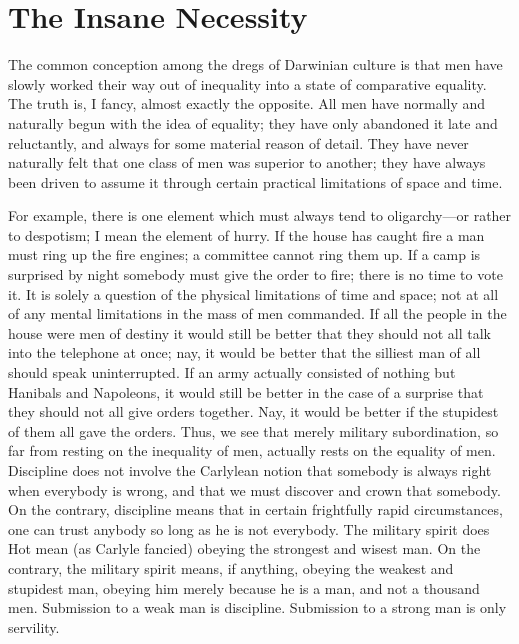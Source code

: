 \documentclass{book}
\begin{document}
\chapter{The Insane Necessity}
\label{chapter-17}
The common conception among the dregs of Darwinian culture is that men have slowly worked their way out of inequality into a state of comparative equality. The truth is, I fancy, almost exactly the opposite. All men have normally and naturally begun with the idea of equality; they have only abandoned it late and reluctantly, and always for some material reason of detail. They have never naturally felt that one class of men was superior to another; they have always been driven to assume it through certain practical limitations of space and time.

For example, there is one element which must always tend to oligarchy—or rather to despotism; I mean the element of hurry. If the house has caught fire a man must ring up the fire engines; a committee cannot ring them up. If a camp is surprised by night somebody must give the order to fire; there is no time to vote it. It is solely a question of the physical limitations of time and space; not at all of any mental limitations in the mass of men commanded. If all the people in the house were men of destiny it would still be better that they should not all talk into the telephone at once; nay, it would be better that the silliest man of all should speak uninterrupted. If an army actually consisted of nothing but Hanibals and Napoleons, it would still be better in the case of a surprise that they should not all give orders together. Nay, it would be better if the stupidest of them all gave the orders. Thus, we see that merely military subordination, so far from resting on the inequality of men, actually rests on the equality of men. Discipline does not involve the Carlylean notion that somebody is always right when everybody is wrong, and that we must discover and crown that somebody. On the contrary, discipline means that in certain frightfully rapid circumstances, one can trust anybody so long as he is not everybody. The military spirit does Hot mean (as Carlyle fancied) obeying the strongest and wisest man. On the contrary, the military spirit means, if anything, obeying the weakest and stupidest man, obeying him merely because he is a man, and not a thousand men. Submission to a weak man is discipline. Submission to a strong man is only servility.
\end{document}
